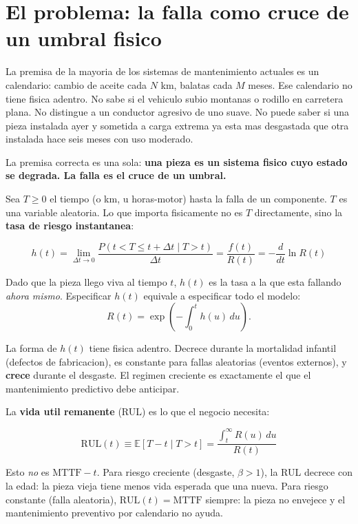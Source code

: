 \documentclass[10.5pt,a4paper]{article}
\begin{document}
\newpage

\section{El problema: la falla como cruce de un umbral fisico}

La premisa de la mayoria de los sistemas de mantenimiento actuales es un calendario: cambio de aceite cada $N$ km, balatas cada $M$ meses.
Ese calendario no tiene fisica adentro. No sabe si el vehiculo subio montanas o rodillo en carretera plana. No distingue a un conductor agresivo de uno suave. No puede saber si una pieza instalada ayer y sometida a carga extrema ya esta mas desgastada que otra instalada hace seis meses con uso moderado.

La premisa correcta es una sola: \textbf{una pieza es un sistema fisico cuyo estado se degrada. La falla es el cruce de un umbral.}

Sea $T \geq 0$ el tiempo (o km, u horas-motor) hasta la falla de un componente.
$T$ es una variable aleatoria. Lo que importa fisicamente no es $T$ directamente, sino la \textbf{tasa de riesgo instantanea}:

\begin{mathbox}
$$h(t) = \lim_{\Delta t \to 0} \frac{P(t < T \leq t+\Delta t \mid T > t)}{\Delta t} = \frac{f(t)}{R(t)} = -\frac{d}{dt}\ln R(t)$$

Dado que la pieza llego viva al tiempo $t$, $h(t)$ es la tasa a la que esta fallando \textit{ahora mismo}.
Especificar $h(t)$ equivale a especificar todo el modelo:
$$R(t) = \exp\!\left(-\int_0^t h(u)\,du\right).$$
\end{mathbox}

La forma de $h(t)$ tiene fisica adentro. Decrece durante la mortalidad infantil (defectos de fabricacion), es constante para fallas aleatorias (eventos externos), y \textbf{crece} durante el desgaste. El regimen creciente es exactamente el que el mantenimiento predictivo debe anticipar.

La \textbf{vida util remanente} (RUL) es lo que el negocio necesita:

\begin{mathbox}
$$\mathrm{RUL}(t) \equiv \mathbb{E}[T - t \mid T > t] = \frac{\displaystyle\int_t^\infty R(u)\,du}{R(t)}$$

Esto \textit{no} es $\mathrm{MTTF} - t$. Para riesgo creciente (desgaste, $\beta > 1$), la RUL decrece con la edad: la pieza vieja tiene menos vida esperada que una nueva. Para riesgo constante (falla aleatoria), $\mathrm{RUL}(t) = \mathrm{MTTF}$ siempre: la pieza no envejece y el mantenimiento preventivo por calendario no ayuda.
\end{mathbox}
\end{document}
